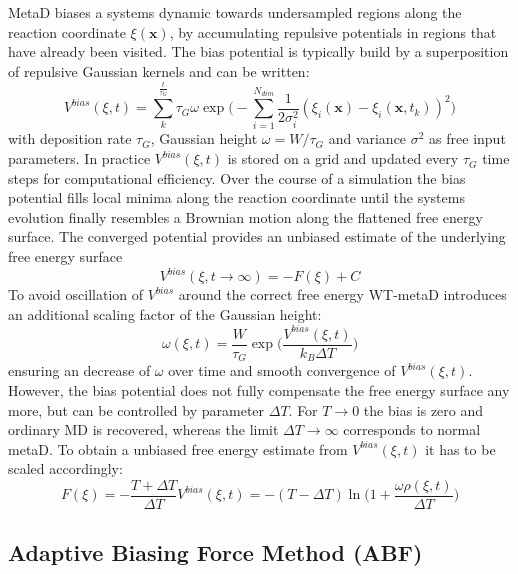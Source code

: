 MetaD biases a systems dynamic towards undersampled regions along the reaction coordinate $\xi(\textbf{x})$, by accumulating repulsive potentials in regions that have already been visited. The bias potential is typically build by a superposition of repulsive Gaussian kernels and can be written:\autocite{barducci2011metadynamics}
\begin{equation}
  V^{bias}(\xi,t)= \sum_{k}^{\frac{t}{\tau_G}} \tau_G \omega \exp\biggr(-\sum_{i=1}^{N_{dim}} \frac{1}{2\sigma_{i}^{2}} (\xi_{i}(\textbf{x})-\xi_{i}(\textbf{x},t_k))^2 \biggl)
\end{equation}
with deposition rate $\tau_G$, Gaussian height $\omega=W/\tau_G$ and variance $\sigma^2$ as free input parameters. In practice $V^{bias}(\xi,t)$ is stored on a grid and updated every $\tau_G$ time steps for computational efficiency. Over the course of a simulation the bias potential fills local minima along the reaction coordinate until the systems evolution finally resembles a Brownian motion along the flattened free energy surface. The converged potential provides an unbiased estimate of the underlying free energy surface
\begin{equation}
  V^{bias}(\xi, t \to \infty) = - F(\xi) + C
\end{equation}
To avoid oscillation of $V^{bias}$ around the correct free energy WT-metaD introduces an additional scaling factor of the Gaussian height:\autocite{barducci2008well}
\begin{equation}
  \omega(\xi,t) = \frac{W}{\tau_G}\exp\biggl(\frac{V^{bias}(\xi,t)}{k_B \Delta T} \biggr)
\end{equation}
ensuring an decrease of $\omega$ over time and smooth convergence of $V^{bias}(\xi,t)$. However, the bias potential does not fully compensate the free energy surface any more, but can be controlled by parameter $\Delta T$. For $T \to 0$ the bias is zero and ordinary MD is recovered, whereas the limit $\Delta T \to \infty$ corresponds to normal metaD. To obtain a unbiased free energy estimate from $V^{bias}(\xi,t)$ it has to be scaled accordingly:
\begin{equation}
F(\xi) = -\frac{T+\Delta T}{\Delta T}V^{bias}(\xi, t) = -(T-\Delta T)\ln \biggl(1+\frac{\omega \rho(\xi, t)}{\Delta T} \biggr)
\end{equation}

\subsection{Adaptive Biasing Force Method (ABF)}
\label{sec:ABF}

